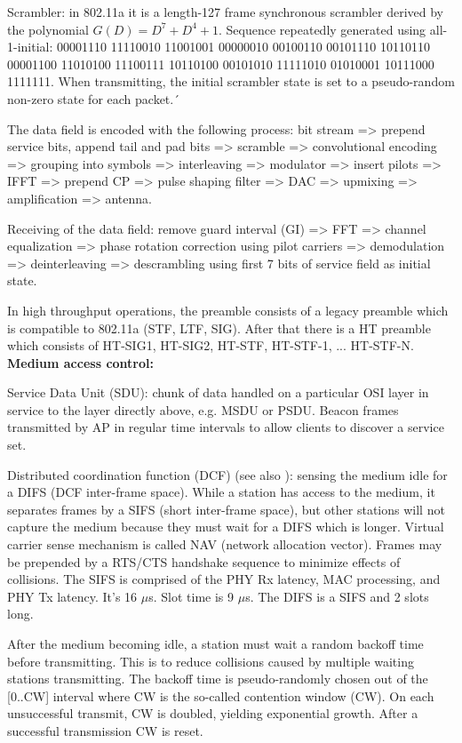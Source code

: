Scrambler: in 802.11a it is a length-127 frame synchronous scrambler derived by the polynomial $G(D)=D^7+D^4+1$. Sequence repeatedly generated using all-1-initial: 00001110 11110010 11001001 00000010 00100110 00101110 10110110 00001100 11010100 11100111 10110100 00101010 11111010 01010001 10111000 1111111. When transmitting, the initial scrambler state is set to a pseudo-random non-zero state for each packet.´

The data field is encoded with the following process: bit stream => prepend service bits, append tail and pad bits => scramble => convolutional encoding => grouping into symbols => interleaving => modulator => insert pilots => IFFT => prepend CP => pulse shaping filter => DAC => upmixing => amplification => antenna.

Receiving of the data field: remove guard interval (GI) => FFT => channel equalization => phase rotation correction using pilot carriers => demodulation => deinterleaving => descrambling using first 7 bits of service field as initial state.

In high throughput operations, the preamble consists of a legacy preamble which is compatible to 802.11a (STF, LTF, SIG). After that there is a HT preamble which consists of HT-SIG1, HT-SIG2, HT-STF, HT-STF-1, ... HT-STF-N.\\

\textbf{Medium access control:}

Service Data Unit (SDU): chunk of data handled on a particular OSI layer in service to the layer directly above, e.g. MSDU or PSDU. Beacon frames transmitted by AP in regular time intervals to allow clients to discover a service set.

Distributed coordination function (DCF) (see also \cite{bianchi2000}): sensing the medium idle for a DIFS (DCF inter-frame space). While a station has access to the medium, it separates frames by a SIFS (short inter-frame space), but other stations will not capture the medium because they must wait for a DIFS which is longer. Virtual carrier sense mechanism is called NAV (network allocation vector). Frames may be prepended by a RTS/CTS handshake sequence to minimize effects of collisions. The SIFS is comprised of the PHY Rx latency, MAC processing, and PHY Tx latency. It's 16 $\mu$s. Slot time is 9 $\mu$s. The DIFS is a SIFS and 2 slots long.

After the medium becoming idle, a station must wait a random backoff time before transmitting. This is to reduce collisions caused by multiple waiting stations transmitting. The backoff time is pseudo-randomly chosen out of the [0..CW] interval where CW is the so-called contention window (CW). On each unsuccessful transmit, CW is doubled, yielding exponential growth. After a successful transmission CW is reset.

